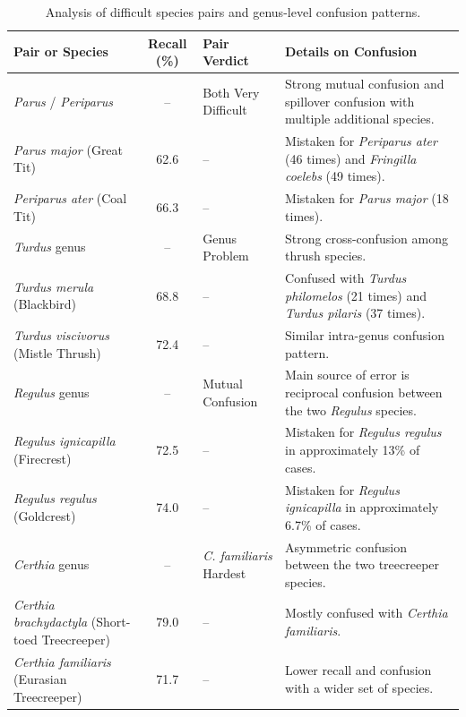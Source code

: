 \documentclass[a4paper,singleside,12pt]{report} %
\begin{document}
	\begin{table}[H]
		\centering
		\scriptsize
		\renewcommand{\arraystretch}{1.15}
		\setlength{\tabcolsep}{6pt}
		\caption{Analysis of difficult species pairs and genus-level confusion patterns.}
		\label{tab:difficult_species_pairs}
		\begin{tabular}{|p{3.3cm}|c|p{2.9cm}|p{6.2cm}|}
			\hline
			Pair or Species & Recall (\%) & Pair Verdict & Details on Confusion \\
			\hline
			\emph{Parus} / \emph{Periparus} & -- & Both Very Difficult & Strong mutual confusion and spillover confusion with multiple additional species. \\
			\hline
			\emph{Parus major} (Great Tit) & 62.6 & -- & Mistaken for \emph{Periparus ater} (46 times) and \emph{Fringilla coelebs} (49 times). \\
			\hline
			\emph{Periparus ater} (Coal Tit) & 66.3 & -- & Mistaken for \emph{Parus major} (18 times). \\
			\hline
			\emph{Turdus} genus & -- & Genus Problem & Strong cross-confusion among thrush species. \\
			\hline
			\emph{Turdus merula} (Blackbird) & 68.8 & -- & Confused with \emph{Turdus philomelos} (21 times) and \emph{Turdus pilaris} (37 times). \\
			\hline
			\emph{Turdus viscivorus} (Mistle Thrush) & 72.4 & -- & Similar intra-genus confusion pattern. \\
			\hline
			\emph{Regulus} genus & -- & Mutual Confusion & Main source of error is reciprocal confusion between the two \emph{Regulus} species. \\
			\hline
			\emph{Regulus ignicapilla} (Firecrest) & 72.5 & -- & Mistaken for \emph{Regulus regulus} in approximately 13\% of cases. \\
			\hline
			\emph{Regulus regulus} (Goldcrest) & 74.0 & -- & Mistaken for \emph{Regulus ignicapilla} in approximately 6.7\% of cases. \\
			\hline
			\emph{Certhia} genus & -- & \emph{C. familiaris} Hardest & Asymmetric confusion between the two treecreeper species. \\
			\hline
			\emph{Certhia brachydactyla} (Short-toed Treecreeper) & 79.0 & -- & Mostly confused with \emph{Certhia familiaris}. \\
			\hline
			\emph{Certhia familiaris} (Eurasian Treecreeper) & 71.7 & -- & Lower recall and confusion with a wider set of species. \\
			\hline
		\end{tabular}
	\end{table}
\end{document}
